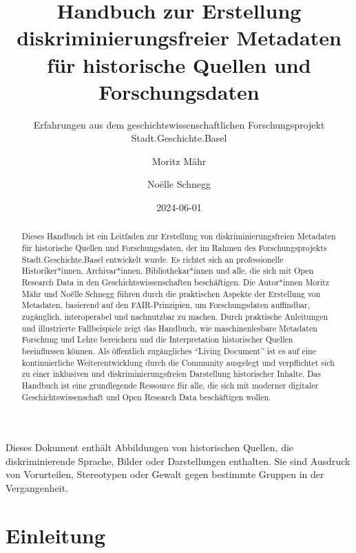 \documentclass[
  letterpaper,
  DIV=11,
  numbers=noendperiod,
  landscape,
  a4paper,
  geometry:margin=1in]{scrartcl}
\title{Handbuch zur Erstellung diskriminierungsfreier Metadaten für
historische Quellen und Forschungsdaten}
\subtitle{Erfahrungen aus dem geschichtswissenschaftlichen
Forschungsprojekt Stadt.Geschichte.Basel}
\author{Moritz Mähr \and Noëlle Schnegg}
\date{2024-06-01}
\begin{document}
\maketitle
\begin{abstract}
Dieses Handbuch ist ein Leitfaden zur Erstellung von
diskriminierungsfreien Metadaten für historische Quellen und
Forschungsdaten, der im Rahmen des Forschungsprojekts
Stadt.Geschichte.Basel entwickelt wurde. Es richtet sich an
professionelle Historiker*innen, Archivar*innen, Bibliothekar*innen und
alle, die sich mit Open Research Data in den Geschichtswissenschaften
beschäftigen. Die Autor*innen Moritz Mähr und Noëlle Schnegg führen
durch die praktischen Aspekte der Erstellung von Metadaten, basierend
auf den FAIR-Prinzipien, um Forschungsdaten auffindbar, zugänglich,
interoperabel und nachnutzbar zu machen. Durch praktische Anleitungen
und illustrierte Fallbeispiele zeigt das Handbuch, wie maschinenlesbare
Metadaten Forschung und Lehre bereichern und die Interpretation
historischer Quellen beeinflussen können. Als öffentlich zugängliches
``Living Document'' ist es auf eine kontinuierliche Weiterentwicklung
durch die Community ausgelegt und verpflichtet sich zu einer inklusiven
und diskriminierungsfreien Darstellung historischer Inhalte. Das
Handbuch ist eine grundlegende Ressource für alle, die sich mit moderner
digitaler Geschichtswissenschaft und Open Research Data beschäftigen
wollen.
\end{abstract}

\begin{tcolorbox}[enhanced jigsaw, colframe=quarto-callout-warning-color-frame, bottomtitle=1mm, coltitle=black, opacitybacktitle=0.6, toprule=.15mm, opacityback=0, arc=.35mm, toptitle=1mm, title=\textcolor{quarto-callout-warning-color}{\faExclamationTriangle}\hspace{0.5em}{Warnung}, colbacktitle=quarto-callout-warning-color!10!white, colback=white, bottomrule=.15mm, breakable, titlerule=0mm, rightrule=.15mm, leftrule=.75mm, left=2mm]

Dieses Dokument enthält Abbildungen von historischen Quellen, die
diskriminierende Sprache, Bilder oder Darstellungen enthalten. Sie sind
Ausdruck von Vorurteilen, Stereotypen oder Gewalt gegen bestimmte
Gruppen in der Vergangenheit.

\end{tcolorbox}

\section{Einleitung}\label{einleitung}
\end{document}
